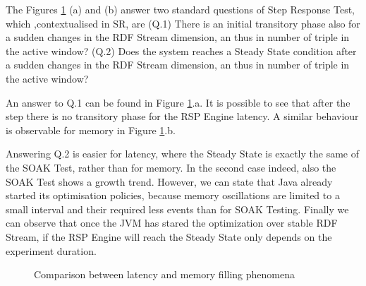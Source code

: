 The Figures \ref{fig:level3-step} (a) and (b) answer two standard questions of Step Response Test, which ,contextualised in SR, are (Q.1) There is an initial transitory phase also for a sudden changes in the RDF Stream dimension, an thus in number of triple in the active window? (Q.2) Does the system reaches a Steady State condition after a sudden changes in the RDF Stream dimension, an thus in number of triple in the active window?

An answer to Q.1 can be found in Figure \ref{fig:level3-step}.a. It is possible to see that after the step there is no transitory phase for the RSP Engine latency. A similar behaviour is observable for memory in Figure \ref{fig:level3-step}.b. 

Answering Q.2 is easier for latency, where the Steady State is exactly the same of the SOAK Test, rather than for memory. In the second case indeed, also the SOAK Test shows a growth trend. However, we can state that Java already started its optimisation policies, because memory oscillations are limited to a small interval and their required less events than for SOAK Testing. Finally we can observe that once the JVM has stared the optimization over stable RDF Stream, if the RSP Engine will reach the Steady State only depends on the experiment duration.

\begin{figure}[tbh]
  \centering
	\caption[\textsc{Analyser} Investigation Stack - Level 3 - Inter Experiment Comparison - Step Response Test]{Comparison between latency and memory filling phenomena} 
  	\label{fig:level3-step}
\end{figure}

%





